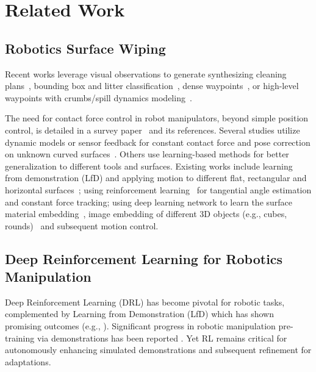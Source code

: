 \section{Related Work}
\subsection{Robotics Surface Wiping}

Recent works leverage visual observations to generate synthesizing cleaning plans~\cite{hess2011learning, elliott2018robotic}, bounding box and litter classification~\cite{yin2020table}, dense waypoints~\cite{cauli2018autonomous, kim2018icub}, or high-level waypoints with crumbs/spill dynamics modeling~\cite{lew2023robotic}. 

The need for contact force control in robot manipulators, beyond simple position control, is detailed in a survey paper~\cite{suomalainen2022survey} and its references. Several studies utilize dynamic models or sensor feedback for constant contact force and pose correction on unknown curved surfaces~\cite{qian2019sensorless, lin2022real, li2022real, zapico2024semi}. Others use learning-based methods for better generalization to different tools and surfaces. Existing works include learning from demonstration (LfD) and applying motion to different flat, rectangular and horizontal surfaces~\cite{elliott2017learning}; using reinforcement learning~\cite{zhang2020robotic} for tangential angle estimation and constant force tracking; using deep learning network to learn the surface material embedding~\cite{kawaharazuka2022learning}, image embedding of different 3D objects (e.g., cubes, rounds)~\cite{saito2020wiping, saito2021utilization} and subsequent motion control. 









\subsection{Deep Reinforcement Learning for Robotics Manipulation}



Deep Reinforcement Learning (DRL) has become pivotal for robotic tasks, complemented by Learning from Demonstration (LfD) which has shown promising outcomes (e.g., \cite{kim2018icub, gams2016adaptation}). Significant progress in robotic manipulation pre-training via demonstrations has been reported \cite{brohan2023rt}. 
Yet RL remains critical for autonomously enhancing simulated demonstrations and subsequent refinement for adaptations. 




